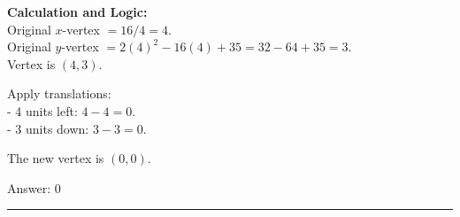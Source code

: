 \documentclass[11pt,paper=a4,answers]{exam}
\begin{document}
\begin{questions}
\begin{solution}
\textbf{Calculation and Logic:} \\
Original $x$-vertex $= 16/4 = 4$. \\
Original $y$-vertex $= 2(4)^2 - 16(4) + 35 = 32 - 64 + 35 = 3$. \\
Vertex is $(4, 3)$.

\vspace{10pt}

Apply translations: \\
- 4 units left: $4 - 4 = 0$. \\
- 3 units down: $3 - 3 = 0$.

\vspace{10pt}

The new vertex is $(0, 0)$.

\vspace{25pt}

Answer: \colorbox{yellow!100}{0}
\end{solution}


\end{questions}
\begin{center}
\rule{.5\textwidth}{1pt}
\end{center}
\end{document}
